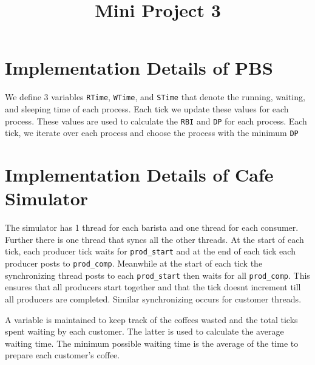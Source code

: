\documentclass{article}
\title{Mini Project 3}
\date{}
\begin{document}
\maketitle

\section{Implementation Details of PBS}
We define 3 variables \verb|RTime|, \verb|WTime|, and \verb|STime| that denote the running, waiting, and sleeping time of each process. Each tick we update these values for each process. These values are used to calculate the \verb|RBI| and \verb|DP| for each process. Each tick, we iterate over each process and choose the process with the minimum \verb|DP|

\section{Implementation Details of Cafe Simulator}
The simulator has 1 thread for each barista and one thread for each consumer. Further there is one thread that syncs all the other threads. At the start of each tick, each producer tick waits for \verb|prod_start| and at the end of each tick each producer posts to \verb|prod_comp|. Meanwhile at the start of each tick the synchronizing thread posts to each \verb|prod_start| then waits for all \verb|prod_comp|. This ensures that all producers start together and that the tick doesnt increment till all producers are completed. Similar synchronizing occurs for customer threads.

A variable is maintained to keep track of the coffees wasted and the total ticks spent waiting by each customer. The latter is used to calculate the average waiting time. The minimum possible  waiting time is the average of the time to prepare each customer's coffee.
\end{document}
